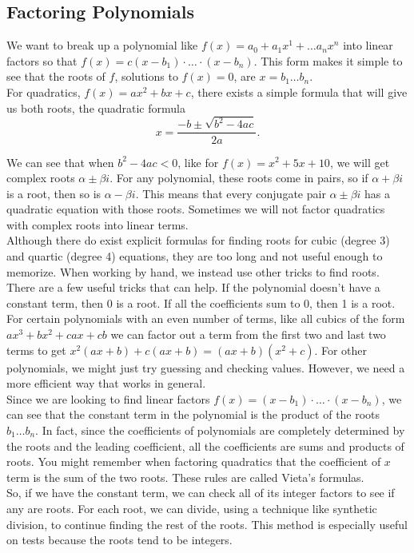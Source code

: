 \subsection{Factoring Polynomials}
\noindent
We want to break up a polynomial like $f(x) = a_0 + a_1x^1 + \ldots a_nx^n$ into linear factors so that $f(x) = c(x-b_1)\cdot \ldots \cdot(x - b_n)$. This form makes it simple to see that the roots of $f$, solutions to $f(x) = 0$, are $x = b_1 \ldots b_n$.\\

\noindent
For quadratics, $f(x) = ax^2 + bx + c$, there exists a simple formula that will give us both roots, the quadratic formula
\begin{equation*}
	x = \frac{-b \pm \sqrt{b^2-4ac}}{2a}.
\end{equation*}

\noindent
We can see that when $b^2 - 4ac < 0$, like for $f(x) = x^2 + 5x + 10$, we will get complex roots $\alpha \pm \beta i$. For any polynomial, these roots come in pairs, so if $\alpha + \beta i$ is a root, then so is $\alpha - \beta i$. This means that every conjugate pair $\alpha \pm \beta i$ has a quadratic equation with those roots. Sometimes we will not factor quadratics with complex roots into linear terms.\\

\noindent
Although there do exist explicit formulas for finding roots for cubic (degree 3) and quartic (degree 4) equations, they are too long and not useful enough to memorize. When working by hand, we instead use other tricks to find roots.\\

\noindent
There are a few useful tricks that can help. If the polynomial doesn't have a constant term, then 0 is a root. If all the coefficients sum to 0, then 1 is a root. For certain polynomials with an even number of terms, like all cubics of the form $ax^3 + bx^2 + cax + cb$ we can factor out a term from the first two and last two terms to get $x^2(ax+b)+c(ax+b) = (ax+b)(x^2+c)$. For other polynomials, we might just try guessing and checking values. However, we need a more efficient way that works in general.\\

\noindent
Since we are looking to find linear factors $f(x) = (x-b_1)\cdot \ldots \cdot(x-b_n)$, we can see that the constant term in the polynomial is the product of the roots $b_1 \ldots b_n$. In fact, since the coefficients of polynomials are completely determined by the roots and the leading coefficient, all the coefficients are sums and products of roots. You might remember when factoring quadratics that the coefficient of $x$ term is the sum of the two roots. These rules are called Vieta's formulas.\\

\noindent
So, if we have the constant term, we can check all of its integer factors to see if any are roots. For each root, we can divide, using a technique like synthetic division, to continue finding the rest of the roots. This method is especially useful on tests because the roots tend to be integers.

